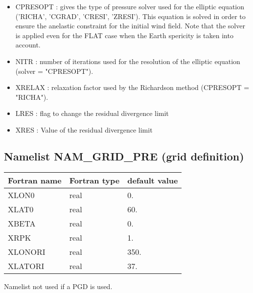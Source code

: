 \begin{itemize}

\item
CPRESOPT :  gives the type of pressure solver used for
the elliptic equation ('RICHA', 'CGRAD', 'CRESI', 'ZRESI').
 This equation is solved in order to ensure the anelastic 
constraint for the initial wind field. Note that the solver is applied even for
the FLAT case when the Earth spericity is taken into account.

\item
NITR  : number of  iterations used for the resolution of the elliptic equation (solver = "CPRESOPT").

\item
XRELAX  : relaxation factor used by the Richardson method (CPRESOPT = "RICHA").

\item LRES : flag to change the residual divergence limit

\item XRES : Value of the residual divergence limit

\end{itemize}  


\subsection{Namelist NAM\_GRID\_PRE (grid definition)}


\begin{center}
\begin{tabular} {|l|l|l|}
\hline
Fortran name & Fortran type & default value \\
\hline
XLON0   & real & 0. \\
XLAT0   & real & 60. \\
XBETA   & real & 0. \\
XRPK    & real & 1. \\
XLONORI & real & 350.    \\
XLATORI & real & 37.    \\
\hline
\end{tabular}
\end{center}

\noindent Namelist not used if a PGD is used.

